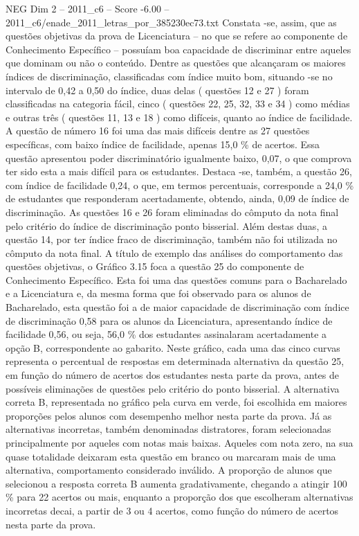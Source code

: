 \begin{textsample}{NEG Dim 2 – 2011\_c6 – Score -6.00 – 2011\_c6/enade\_2011\_letras\_por\_385230ec73.txt}
Constata -se, assim, que as questões objetivas da prova de Licenciatura – no que se refere ao componente de Conhecimento Específico – possuíam boa capacidade de discriminar entre aqueles que dominam ou não o conteúdo.
Dentre as questões que alcançaram os maiores índices de discriminação, classificadas com índice muito bom, situando -se no intervalo de 0,42 a 0,50 do índice, duas delas ( questões 12 e 27 ) foram classificadas na categoria fácil, cinco ( questões 22, 25, 32, 33 e 34 ) como médias e outras três ( questões 11, 13 e 18 ) como difíceis, quanto ao índice de facilidade.
A questão de número 16 foi uma das mais difíceis dentre as 27 questões específicas, com baixo índice de facilidade, apenas 15,0 \% de acertos.
Essa questão apresentou poder discriminatório igualmente baixo, 0,07, o que comprova ter sido esta a mais difícil para os estudantes.
Destaca -se, também, a questão 26, com índice de facilidade 0,24, o que, em termos percentuais, corresponde a 24,0 \% de estudantes que responderam acertadamente, obtendo, ainda, 0,09 de índice de discriminação.
As questões 16 e 26 foram eliminadas do cômputo da nota final pelo critério do índice de discriminação ponto bisserial.
Além destas duas, a questão 14, por ter índice fraco de discriminação, também não foi utilizada no cômputo da nota final.
A título de exemplo das análises do comportamento das questões objetivas, o Gráfico 3.15 foca a questão 25 do componente de Conhecimento Específico.
Esta foi uma das questões comuns para o Bacharelado e a Licenciatura e, da mesma forma que foi observado para os alunos de Bacharelado, esta questão foi a de maior capacidade de discriminação com índice de discriminação 0,58 para os alunos da Licenciatura, apresentando índice de facilidade 0,56, ou seja, 56,0 \% dos estudantes assinalaram acertadamente a opção B, correspondente ao gabarito.
Neste gráfico, cada uma das cinco curvas representa o percentual de respostas em determinada alternativa da questão 25, em função do número de acertos dos estudantes nesta parte da prova, antes de possíveis eliminações de questões pelo critério do ponto bisserial.
A alternativa correta B, representada no gráfico pela curva em verde, foi escolhida em maiores proporções pelos alunos com desempenho melhor nesta parte da prova.
Já as alternativas incorretas, também denominadas distratores, foram selecionadas principalmente por aqueles com notas mais baixas.
Aqueles com nota zero, na sua quase totalidade deixaram esta questão em branco ou marcaram mais de uma alternativa, comportamento considerado inválido.
A proporção de alunos que selecionou a resposta correta B aumenta gradativamente, chegando a atingir 100 \% para 22 acertos ou mais, enquanto a proporção dos que escolheram alternativas incorretas decai, a partir de 3 ou 4 acertos, como função do número de acertos nesta parte da prova.

\end{textsample}
